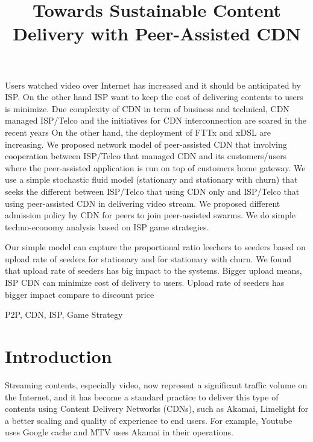 \documentclass[paper]{ieice}
\title{Towards Sustainable Content Delivery with Peer-Assisted CDN}
\begin{document}
\maketitle

\begin{summary}
Users watched video over Internet has increased and it should be anticipated by ISP.  
On the other hand ISP want to keep the cost of delivering contents to users is minimize.
Due complexity of CDN in term of business and technical, CDN managed ISP/Telco and the initiatives for CDN interconnection are soared in the recent years
On the other hand, the deployment of FTTx and xDSL are increasing.  
We proposed network model of peer-assisted CDN that involving cooperation between ISP/Telco that managed CDN and its customers/users where the peer-assisted application is run on top of customers home gateway.  
We use a simple stochastic fluid model (stationary and stationary with churn) that seeks the different between ISP/Telco that using CDN only and ISP/Telco that using peer-assisted CDN in delivering video stream. We proposed different admission policy by CDN for peers to join peer-assisted swarms.  
We do simple techno-economy analysis based on ISP game strategies. 

Our simple model can capture the proportional ratio leechers to seeders based on upload rate of seeders for stationary and for stationary with churn.  
We found that upload rate of seeders has big impact to the systems. 
Bigger upload means, ISP CDN can minimize cost of delivery to users.   
Upload rate of seeders has bigger impact compare to discount price


\end{summary}
\begin{keywords}
P2P, CDN, ISP, Game Strategy
\end{keywords}  

\section{Introduction}\label{intro}
Streaming contents, especially video, now represent a significant traffic volume on the Internet, and it has become a standard practice to deliver this type of contents using Content Delivery Networks (CDNs), such as Akamai, Limelight for a better scaling and quality of experience to end users.
For example, Youtube uses Google cache and MTV uses Akamai in their operations.
\end{document}
